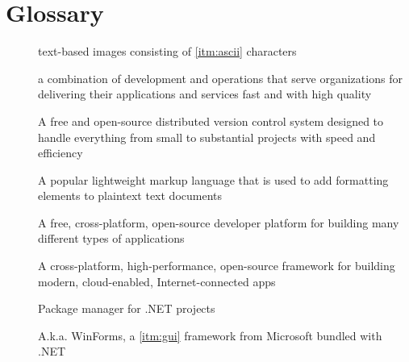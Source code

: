 \chapter*{Glossary}

\begin{description}
    \item [] text-based images consisting of \ref{itm:ascii} characters \cite{randal_ascii_2015}
    \item [] a combination of development and operations that serve organizations for delivering their applications and services fast and with high quality \cite{amazon_web_services_inc_what_nodate}
    \item [] A free and open-source distributed version control system designed to handle everything from small to substantial projects with speed and efficiency \cite{git_git_2022}
    \item [] A popular lightweight markup language that is used to add formatting elements to plaintext text documents \cite{cone_getting_2022}
    \item [] A free, cross-platform, open-source developer platform for building many different types of applications \cite{microsoft_what_2022}
    \item [] A cross-platform, high-performance, open-source framework for building modern, cloud-enabled, Internet-connected apps \cite{anderson_overview_2022}
    \item [] Package manager for .NET projects \cite{microsoft_nuget_2022}
    \item [] A.k.a. WinForms, a \ref{itm:gui} framework from Microsoft bundled with .NET \cite{george_what_2022}
\end{description}